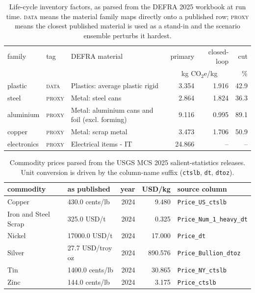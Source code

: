 \documentclass[11pt,a4paper]{article}
\begin{document}
\begin{table}[t]
\centering\small
\caption{Life-cycle inventory factors, as parsed from the DEFRA 2025 workbook at
run time. \textsc{data} means the material family maps directly onto a
published row; \textsc{proxy} means the closest published material is used as
a stand-in and the scenario ensemble perturbs it hardest.}
\label{tab:factors}
\begin{tabular}{llp{6.0cm}rrr}
\toprule
family & tag & DEFRA material & primary & closed-loop & cut \\
 & & & \multicolumn{2}{c}{kg CO$_2$e/kg} & \% \\
\midrule
plastic & \textsc{data} & Plastics: average plastic rigid & 3.354 & 1.916 & 42.9 \\
steel & \textsc{proxy} & Metal: steel cans & 2.864 & 1.824 & 36.3 \\
aluminium & \textsc{proxy} & Metal: aluminium cans and foil (excl. forming) & 9.116 & 0.995 & 89.1 \\
copper & \textsc{proxy} & Metal: scrap metal & 3.473 & 1.706 & 50.9 \\
electronics & \textsc{proxy} & Electrical items - IT & 24.866 & -- & -- \\
\bottomrule
\end{tabular}
\end{table}

\begin{table}[t]
\centering\small
\caption{Commodity prices parsed from the USGS MCS 2025 salient-statistics
releases. Unit conversion is driven by the column-name suffix
(\texttt{ctslb}, \texttt{dt}, \texttt{dtoz}).}
\begin{tabular}{llrrl}
\toprule
commodity & as published & year & USD/kg & source column \\
\midrule
Copper & 430.0 cents/lb & 2024 & 9.480 & \texttt{Price\_US\_ctslb} \\
Iron and Steel Scrap & 325.0 USD/t & 2024 & 0.325 & \texttt{Price\_Num\_1\_heavy\_dt} \\
Nickel & 17000.0 USD/t & 2024 & 17.000 & \texttt{Price\_dt} \\
Silver & 27.7 USD/troy oz & 2024 & 890.576 & \texttt{Price\_Bullion\_dtoz} \\
Tin & 1400.0 cents/lb & 2024 & 30.865 & \texttt{Price\_NY\_ctslb} \\
Zinc & 144.0 cents/lb & 2024 & 3.175 & \texttt{Price\_ctslb} \\
\bottomrule
\end{tabular}
\end{table}
\end{document}
